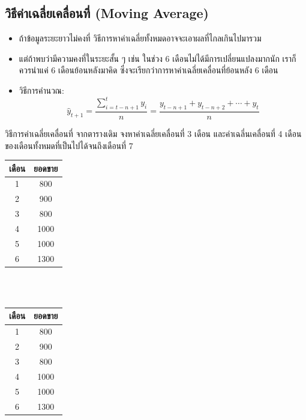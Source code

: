 \subsection{วิธีค่าเฉลี่ยเคลื่อนที่ (Moving Average)}
\begin{itemize}
    \item ถ้าข้อมูลระยะยาวไม่คงที่ วิธีการหาค่าเฉลี่ยทั้งหมดอาจจะเอาผลที่ไกลเกินไปมารวม
    \item แต่ถ้าพบว่ามีความคงที่ในระยะสั้น ๆ เช่น ในช่วง 6 เดือนไม่ได้มีการเปลี่ยนแปลงมากนัก เราก็ควรนำแค่ 6 เดือนย้อนหลังมาคิด ซึ่งจะเรียกว่าการหาค่าเฉลี่ยเคลื่อนที่ย้อนหลัง 6 เดือน
    \item วิธีการคำนวณ:
    \[
    \hat{y}_{t+1} = \frac{\sum_{i=t-n+1}^{t} y_i}{n} = \frac{y_{t-n+1} + y_{t-n+2} + \cdots + y_t}{n}
    \]
\end{itemize}
\begin{example}
    {วิธีการค่าเฉลี่ยเคลื่อนที่}{}
    จากตารางเดิม จงหาค่าเฉลี่ยเคลื่อนที่ 3 เดือน และค่าเฉลี่นเคลื่อนที่ 4 เดือนของเดือนทั้งหมดที่เป็นไปได้จนถึงเดือนที่ 7
\end{example}
\begin{tabular}{|c|c|}
\hline
เดือน & ยอดขาย \\ \hline
1     & 800    \\ \hline
2     & 900    \\ \hline
3     & 800    \\ \hline
4     & 1000   \\ \hline
5     & 1000   \\ \hline
6     & 1300   \\ \hline
\end{tabular}\\
~
\vspace{1cm}\\
\noindent\begin{tabular}{|c|c|}
\hline
เดือน & ยอดขาย \\ \hline
1     & 800    \\ \hline
2     & 900    \\ \hline
3     & 800    \\ \hline
4     & 1000   \\ \hline
5     & 1000   \\ \hline
6     & 1300   \\ \hline
\end{tabular}
\newpage
